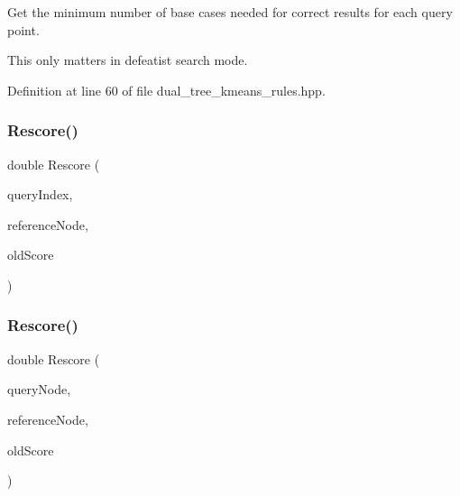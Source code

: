 Get the minimum number of base cases needed for correct results for each query point. 

This only matters in defeatist search mode. 

Definition at line 60 of file dual\+\_\+tree\+\_\+kmeans\+\_\+rules.\+hpp.

\mbox{\label{classmlpack_1_1kmeans_1_1DualTreeKMeansRules_a6f97dd07745e07a2d7ff3d4a42347e48}} 
\subsubsection{Rescore()\hspace{0.1cm}{\footnotesize\ttfamily [1/2]}}
{\footnotesize\ttfamily double Rescore (\begin{DoxyParamCaption}\item[{const size\+\_\+t}]{query\+Index,  }\item[{Tree\+Type \&}]{reference\+Node,  }\item[{const double}]{old\+Score }\end{DoxyParamCaption})}

\mbox{\label{classmlpack_1_1kmeans_1_1DualTreeKMeansRules_a355b654f0c696bfe4f7be6d98c96d1ee}} 
\subsubsection{Rescore()\hspace{0.1cm}{\footnotesize\ttfamily [2/2]}}
{\footnotesize\ttfamily double Rescore (\begin{DoxyParamCaption}\item[{Tree\+Type \&}]{query\+Node,  }\item[{Tree\+Type \&}]{reference\+Node,  }\item[{const double}]{old\+Score }\end{DoxyParamCaption})}

\mbox{\label{classmlpack_1_1kmeans_1_1DualTreeKMeansRules_a53d373b7aeee359b0e686f823c602b1c}} 
